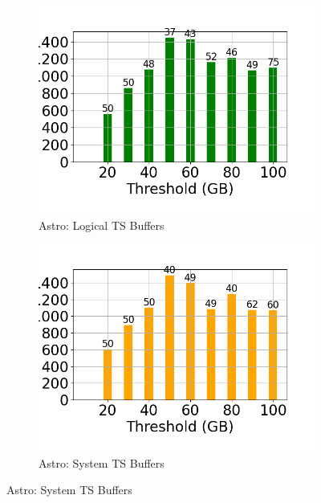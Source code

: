 \begin{figure}
	\centering
	\begin{subfigure}[c]{0.48\textwidth}
		\includegraphics[width=1\textwidth]   {figures/Experiments/Dynamic/ASTRO/Batch_processing/50/average_query_time_per_batch_version_999777015_10485760_10_delay[50].png}
		\caption{Astro: Logical TS Buffers}
		\label{fig:logical-ts-50-astro}
	\end{subfigure}
	\begin{subfigure}[c]{0.48\textwidth}
		\includegraphics[width=1\textwidth]	 {figures/Experiments/Dynamic/ASTRO/Batch_processing/50/average_query_time_per_batch_version_999777018_10485760_10_delay[50].png}
		\caption{Astro: System TS Buffers}
		\label{fig:system-ts-50-astro}

\end{subfigure}
\end{figure}
